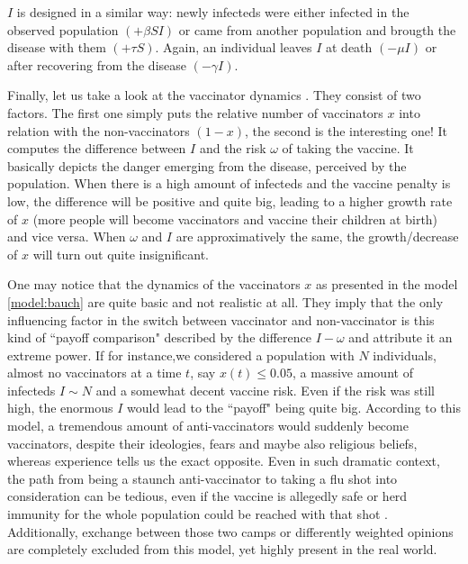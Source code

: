 \documentclass[12pt,a4paper,twoside]{article}
\begin{document}
$I$ is designed in a similar way: newly infecteds were either infected in the observed population $\left(+\beta SI\right)$ or came from another population and brougth the disease with them $\left(+\tau S\right)$. Again, an individual leaves $I$ at death $\left(-\mu I\right)$ or after recovering from the disease $\left(-\gamma I\right)$. 

Finally, let us take a look at the vaccinator dynamics%
. They consist of two factors. The first one simply puts the relative number of vaccinators $x$ into relation with the non-vaccinators $\left(1-x\right)$, the second is the interesting one! It computes the difference between $I$ and the risk $\omega$ of taking the vaccine. It basically depicts the danger emerging from the disease, perceived by the population. When there is a high amount of infecteds and the vaccine penalty is low, the difference will be positive and quite big, leading to a higher growth rate of $x$ (more people will become vaccinators and vaccine their children at birth) and vice versa. When $\omega$ and $I$ are approximatively the same, the growth/decrease of $x$ will turn out quite insignificant.

One may notice that the dynamics of the vaccinators $x$ as presented in the model \eqref{model:bauch} are quite basic and not realistic at all. They imply that the only influencing factor in the switch between vaccinator and non-vaccinator is this kind of ``payoff comparison" described by the difference $I - \omega$ and attribute it an extreme power. If for instance,we considered a population with $N$ individuals, almost no vaccinators at a time $t$, say $x(t) \leq 0.05$, a massive amount of infecteds $I \sim N$ and a somewhat decent vaccine risk. Even if the risk was still high, the enormous $I$ would lead to the ``payoff" being quite big. According to this model, a tremendous amount of anti-vaccinators would suddenly become vaccinators, despite their ideologies, fears and maybe also religious beliefs, whereas experience tells us the exact opposite. Even in such dramatic context, the path from being a staunch anti-vaccinator to taking a flu shot into consideration can be tedious, even if the vaccine is allegedly safe or herd immunity for the whole population could be reached with that shot \cite{Bednarz2020, Health2019}. Additionally, exchange between those two camps or differently weighted opinions are completely excluded from this model, yet highly present in the real world.
\end{document}

